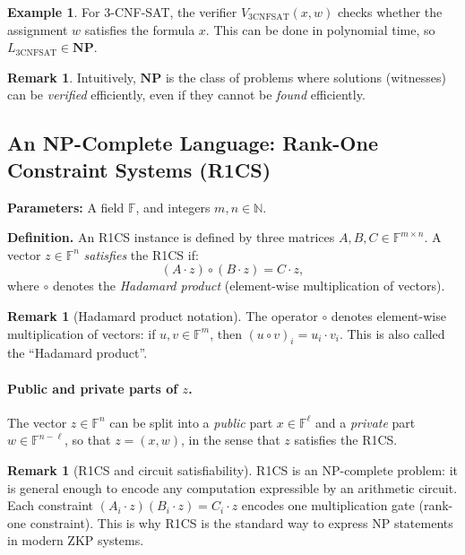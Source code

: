 \documentclass[11pt]{article}
\theoremstyle{plain}
\theoremstyle{definition}
\newtheorem{example}[theorem]{Example}
\newtheorem{remark}[theorem]{Remark}
\begin{document}
\begin{example}
For 3-CNF-SAT, the verifier $V_{\mathrm{3CNFSAT}}(x, w)$ checks whether the assignment $w$
satisfies the formula $x$.  This can be done in polynomial time, so
$L_{\mathrm{3CNFSAT}} \in \mathbf{NP}$.
\end{example}

\begin{remark}
Intuitively, $\mathbf{NP}$ is the class of problems where solutions (witnesses) can be
\emph{verified} efficiently, even if they cannot be \emph{found} efficiently.
\end{remark}

\subsection{An NP-Complete Language: Rank-One Constraint Systems (R1CS)}

\begin{tcolorbox}[colback=purple!5!white, colframe=purple!60!black,
  title=Rank-One Constraint Systems (R1CS)]
\textbf{Parameters:} A field $\mathbb{F}$, and integers $m, n \in \mathbb{N}$.

\medskip
\textbf{Definition.}
An R1CS instance is defined by three matrices $A, B, C \in \mathbb{F}^{m \times n}$.
A vector $z \in \mathbb{F}^n$ \emph{satisfies} the R1CS if:
\[
  (A \cdot z) \circ (B \cdot z) = C \cdot z,
\]
where $\circ$ denotes the \emph{Hadamard product} (element-wise multiplication of vectors).
\end{tcolorbox}

\begin{remark}[Hadamard product notation]
The operator $\circ$ denotes element-wise multiplication of vectors: if $u, v \in \mathbb{F}^m$,
then $(u \circ v)_i = u_i \cdot v_i$.  This is also called the ``Hadamard product''.
\end{remark}

\paragraph{Public and private parts of $z$.}
The vector $z \in \mathbb{F}^n$ can be split into a \emph{public} part $x \in \mathbb{F}^\ell$
and a \emph{private} part $w \in \mathbb{F}^{n-\ell}$, so that $z = (x, w)$, in the sense
that $z$ satisfies the R1CS.

\begin{remark}[R1CS and circuit satisfiability]
R1CS is an NP-complete problem: it is general enough to encode any computation expressible
by an arithmetic circuit.
Each constraint $(A_i \cdot z)(B_i \cdot z) = C_i \cdot z$ encodes one multiplication gate
(rank-one constraint).
This is why R1CS is the standard way to express NP statements in modern ZKP systems.
\end{remark}
\end{document}
